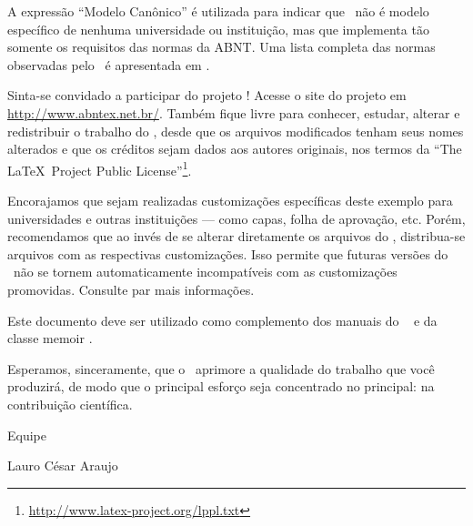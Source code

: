 \documentclass[
	12pt,				%
	openright,			%
	twoside,			%
	a4paper,			%
	chapter=TITLE,		%
	english,			%
	brazil				%
	]{abntex2}
\begin{document}
A expressão ``Modelo Canônico'' é utilizada para indicar que \abnTeX\ não é
modelo específico de nenhuma universidade ou instituição, mas que implementa tão
somente os requisitos das normas da ABNT. Uma lista completa das normas
observadas pelo \abnTeX\ é apresentada em .

Sinta-se convidado a participar do projeto \abnTeX! Acesse o site do projeto em
\url{http://www.abntex.net.br/}. Também fique livre para conhecer,
estudar, alterar e redistribuir o trabalho do \abnTeX, desde que os arquivos
modificados tenham seus nomes alterados e que os créditos sejam dados aos
autores originais, nos termos da ``The \LaTeX\ Project Public
License''\footnote{\url{http://www.latex-project.org/lppl.txt}}.

Encorajamos que sejam realizadas customizações específicas deste exemplo para
universidades e outras instituições --- como capas, folha de aprovação, etc.
Porém, recomendamos que ao invés de se alterar diretamente os arquivos do
\abnTeX, distribua-se arquivos com as respectivas customizações.
Isso permite que futuras versões do \abnTeX~não se tornem automaticamente
incompatíveis com as customizações promovidas. Consulte
 par mais informações.

Este documento deve ser utilizado como complemento dos manuais do \abnTeX\ 
\cite{abntex2classe,abntex2cite,abntex2cite-alf} e da classe \textsf{memoir}
\cite{memoir}. 

Esperamos, sinceramente, que o \abnTeX\ aprimore a qualidade do trabalho que
você produzirá, de modo que o principal esforço seja concentrado no principal:
na contribuição científica.

Equipe \abnTeX 

Lauro César Araujo



\end{document}
